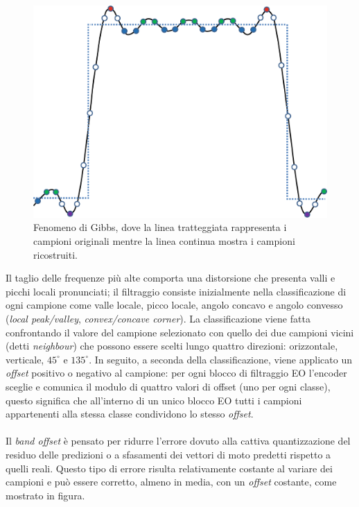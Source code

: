 \begin{figure}[H]
  \centering
  \captionsetup{justification=raggedright}
  \includegraphics[scale=0.35]{Figures/SAO_Gibbs}
  \caption[Fenomeno di Gibbs]
  	  {Fenomeno di Gibbs, dove la linea tratteggiata rappresenta i
	   campioni originali mentre la linea continua mostra i campioni
	   ricostruiti.}
\end{figure}

Il taglio delle frequenze più alte comporta una distorsione che presenta valli e
picchi locali pronunciati; il filtraggio consiste inizialmente nella 
classificazione di ogni campione come valle locale, picco locale, angolo concavo
e angolo convesso (\emph{local peak/valley}, \emph{convex/concave corner}).
La classificazione viene fatta confrontando il valore del campione selezionato 
con quello dei due campioni vicini (detti \emph{neighbour}) che possono essere 
scelti lungo quattro direzioni: orizzontale, verticale, $45^{\circ}$ e 
$135^{\circ}$. In seguito, a seconda della classificazione, viene applicato un
\emph{offset} positivo o negativo al campione: per ogni blocco di filtraggio EO
l'encoder sceglie e comunica il modulo di quattro valori di offset (uno per ogni
classe), questo significa che all'interno di un unico blocco EO tutti i campioni
appartenenti alla stessa classe condividono lo stesso \emph{offset}.
\\ \\
Il \emph{band offset} è pensato per ridurre l'errore dovuto alla cattiva 
quantizzazione del residuo delle predizioni o a sfasamenti dei vettori di moto 
predetti rispetto a quelli reali. Questo tipo di errore risulta relativamente 
costante al variare dei campioni e può essere corretto, almeno in media, con un 
\emph{offset} costante, come mostrato in figura.

